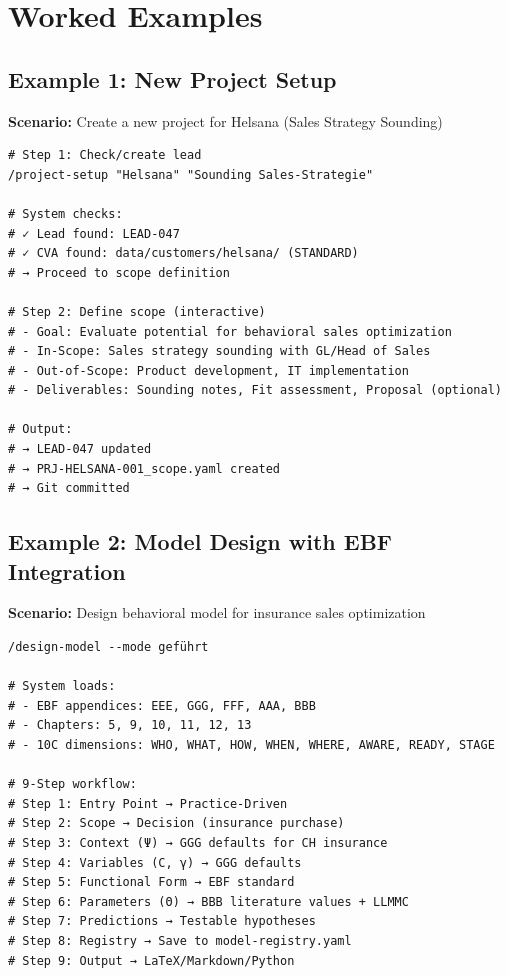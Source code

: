
\section{Worked Examples}
\label{sec:sk-examples}

\subsection{Example 1: New Project Setup}

\textbf{Scenario:} Create a new project for Helsana (Sales Strategy Sounding)

\begin{verbatim}
# Step 1: Check/create lead
/project-setup "Helsana" "Sounding Sales-Strategie"

# System checks:
# ✓ Lead found: LEAD-047
# ✓ CVA found: data/customers/helsana/ (STANDARD)
# → Proceed to scope definition

# Step 2: Define scope (interactive)
# - Goal: Evaluate potential for behavioral sales optimization
# - In-Scope: Sales strategy sounding with GL/Head of Sales
# - Out-of-Scope: Product development, IT implementation
# - Deliverables: Sounding notes, Fit assessment, Proposal (optional)

# Output:
# → LEAD-047 updated
# → PRJ-HELSANA-001_scope.yaml created
# → Git committed
\end{verbatim}

\subsection{Example 2: Model Design with EBF Integration}

\textbf{Scenario:} Design behavioral model for insurance sales optimization

\begin{verbatim}
/design-model --mode geführt

# System loads:
# - EBF appendices: EEE, GGG, FFF, AAA, BBB
# - Chapters: 5, 9, 10, 11, 12, 13
# - 10C dimensions: WHO, WHAT, HOW, WHEN, WHERE, AWARE, READY, STAGE

# 9-Step workflow:
# Step 1: Entry Point → Practice-Driven
# Step 2: Scope → Decision (insurance purchase)
# Step 3: Context (Ψ) → GGG defaults for CH insurance
# Step 4: Variables (C, γ) → GGG defaults
# Step 5: Functional Form → EBF standard
# Step 6: Parameters (Θ) → BBB literature values + LLMMC
# Step 7: Predictions → Testable hypotheses
# Step 8: Registry → Save to model-registry.yaml
# Step 9: Output → LaTeX/Markdown/Python
\end{verbatim}

